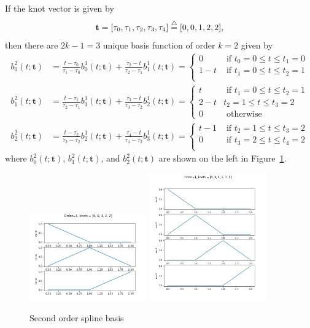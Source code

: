 If the knot vector is given by
\[
\mathbf{t} = [\tau_0, \tau_1, \tau_2, \tau_3, \tau_4] \stackrel{\triangle}{=} [0, 0, 1, 2, 2],
\]
then there are $2k-1=3$ unique basis function of order $k=2$ given by
\begin{align*}
b_0^2(t; \mathbf{t}) &= \frac{t-\tau_0}{\tau_1-\tau_0} b_0^1(t;\mathbf{t}) + \frac{\tau_2-t}{\tau_2-\tau_1}b_1^1(t; \mathbf{t}) 
	= \begin{cases} 0   & \text{~if~} t_0=0 \leq t \leq t_1=0 \\
				    1-t & \text{~if~} t_1=0 \leq t \leq t_2=1 \\ 
 	  \end{cases}
\\ 
b_1^2(t; \mathbf{t}) &= \frac{t-\tau_1}{\tau_2-\tau_1} b_1^1(t;\mathbf{t}) + \frac{\tau_3-t}{\tau_3-\tau_2}b_2^1(t; \mathbf{t})
	= \begin{cases} t & \text{~if~} t_1=0 \leq t \leq t_2=1 \\ 
 									2-t & t_2=1 \leq t \leq t_3=2 \\
 									0 & \text{~otherwise}
 					    \end{cases}
\\ 
b_2^2(t; \mathbf{t}) &= \frac{t-\tau_2}{\tau_3-\tau_2} b_2^1(t;\mathbf{t}) + \frac{\tau_4-t}{\tau_4-\tau_3}b_3^1(t; \mathbf{t})
	= \begin{cases} t-1 & \text{~if~} t_2=1 \leq t \leq t_3=2 \\ 
 					0 & \text{~if~} t_3=2 \leq t \leq t_4=2 \\
 	  \end{cases}
\end{align*}
where $b_0^2(t; \mathbf{t})$, $b_1^2(t; \mathbf{t})$, and $b_2^2(t; \mathbf{t})$ are shown on the left in Figure~\ref{fig:spline_basis_1}.
\begin{figure}[hbt]
  \centering
  	\includegraphics[width=0.45\textwidth]{./chap5_trajectory_planning/figures/spline_basis_1}
  	\includegraphics[width=0.45\textwidth]{./chap5_trajectory_planning/figures/spline_basis_1_extra_knot}
  \caption{Second order spline basis}
  \label{fig:spline_basis_1}  
\end{figure}
